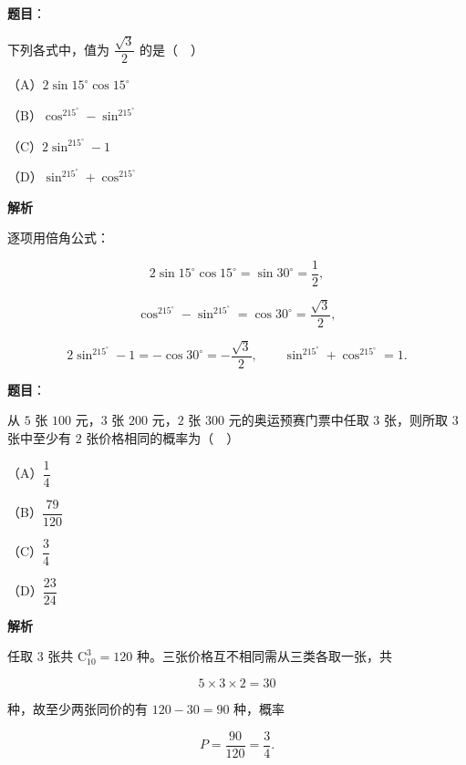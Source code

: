 \begin{answer}

\textbf{题目}：

下列各式中，值为 $\dfrac{\sqrt3}{2}$ 的是（　）

（A）$2\sin15^\circ\cos15^\circ$

（B）$\cos^215^\circ-\sin^215^\circ$

（C）$2\sin^215^\circ-1$

（D）$\sin^215^\circ+\cos^215^\circ$

\textbf{解析}

逐项用倍角公式：

\nopagebreak[4]
\[2\sin15^\circ\cos15^\circ=\sin30^\circ=\frac12,\]

\nopagebreak[4]
\[\cos^215^\circ-\sin^215^\circ=\cos30^\circ=\frac{\sqrt3}2,\]

\nopagebreak[4]
\[2\sin^215^\circ-1=-\cos30^\circ=-\frac{\sqrt3}2,\qquad \sin^215^\circ+\cos^215^\circ=1.\]


\end{answer}
\begin{answer}

\textbf{题目}：

从 $5$ 张 $100$ 元，$3$ 张 $200$ 元，$2$ 张 $300$ 元的奥运预赛门票中任取 $3$ 张，则所取 $3$ 张中至少有 $2$ 张价格相同的概率为（　）

（A）$\dfrac14$

（B）$\dfrac{79}{120}$

（C）$\dfrac34$

（D）$\dfrac{23}{24}$

\textbf{解析}

任取 $3$ 张共 $\mathrm C_{10}^3=120$ 种。三张价格互不相同需从三类各取一张，共

\nopagebreak[4]
\[5\times3\times2=30\]

种，故至少两张同价的有 $120-30=90$ 种，概率

\nopagebreak[4]
\[P=\frac{90}{120}=\frac34.\]


\end{answer}

